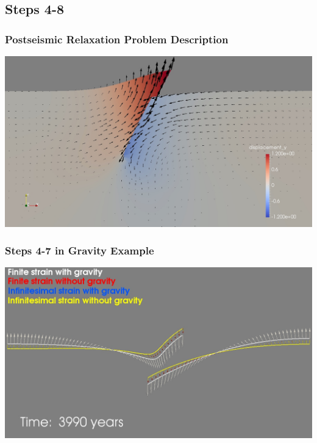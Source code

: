 \documentclass{beamer}
\begin{document}
\subsection{Steps 4-8}

\begin{frame}
  \frametitle{Postseismic Relaxation Problem Description}

  \begin{center}
    \includegraphics[scale=0.3]{figs/step04-08-descr}
  \end{center}
      
\end{frame}


\begin{frame}
  \frametitle{Steps 4-7 in Gravity Example}

  \begin{center}
    \includegraphics[scale=0.3]{figs/step04-07}
  \end{center}
      
\end{frame}
\end{document}
